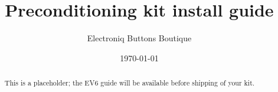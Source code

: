 \documentclass[superscriptaddress,onecolumn,floatfix]{revtex4-2}
\begin{document}
                            
\begin{abstract}
  This is a placeholder; the EV6 guide will be available before shipping of your kit. 
\end{abstract}
\title{Preconditioning kit install guide}
\author{Electroniq Buttons Boutique}
\date{\today}

\maketitle
\end{document}
